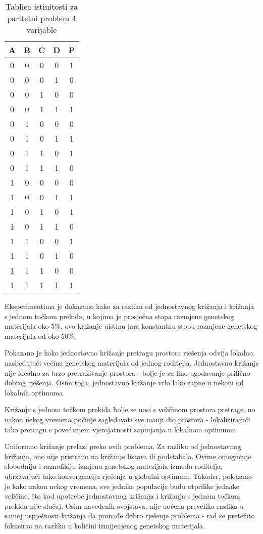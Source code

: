 \begin{table}[H]
\centering
\caption{Tablica istinitosti za paritetni problem 4 varijable}
\begin{tabular} {c c c c | c }
A & B & C & D & P \\
\hline
0 & 0 & 0 & 0 & 1 \\
0 & 0 & 0 & 1 & 0 \\
0 & 0 & 1 & 0 & 0 \\
0 & 0 & 1 & 1 & 1 \\
0 & 1 & 0 & 0 & 0 \\
0 & 1 & 0 & 1 & 1 \\
0 & 1 & 1 & 0 & 1 \\
0 & 1 & 1 & 1 & 0 \\
1 & 0 & 0 & 0 & 0 \\
1 & 0 & 0 & 1 & 1 \\
1 & 0 & 1 & 0 & 1 \\
1 & 0 & 1 & 1 & 0 \\
1 & 1 & 0 & 0 & 1 \\
1 & 1 & 0 & 1 & 0 \\
1 & 1 & 1 & 0 & 0 \\
1 & 1 & 1 & 1 & 1 \\
\end{tabular}

	
	\label{truthTable}
\end{table}

Eksperimentima je dokazano kako za razliku od jednostavnog križanja i križanja s jednom točkom prekida, u kojima je prosječna stopa razmjene genetskog materijala oko 5\%, ovo križanje uistinu ima konstantnu stopu razmjene genetskog materijala od oko 50\%.

Pokazano je kako jednostavno križanje pretragu prostora rješenja odvija lokalno, nasljeđujući većinu genetskog materijala od jednog roditelja. Jednostavno križanje nije idealno za brzo pretraživanje prostora - bolje je za fino ugođavanje prilično dobrog rješenja. Osim toga, jednostavno križanje vrlo lako zapne u nekom od lokalnih optimuma. 

Križanje s jednom točkom prekida bolje se nosi s veličinom prostora pretrage, no nakon nekog vremena počinje sagledavati sve manji dio prostora - lokalizirajući tako pretragu s povećanjem vjerojatnosti zapinjanja u lokalnom optimumu.

Uniformno križanje prelazi preko ovih problema. Za razliku od jednostavnog križanja, ono nije pristrano na križanje listova ili podstabala. Ovime omogućuje slobodniju i raznolikiju izmjenu genetskog materijala između roditelja, ubrzavajući tako konvergenciju rješenja u globalni optimum. Također, pokazano je kako nakon nekog vremena, sve jednike populacije budu otprilike jednake veličine, što kod upotrebe jednostavnog križanja i križanja s jednom točkom prekida nije slučaj. Osim navedenih svojstava, nije uočena prevelika razlika u samoj uspješnosti križanja da pronađe dobro rješenje problema - rad se pretežito fokusirao na razliku u količini izmijenjenog genetskog materijala.


